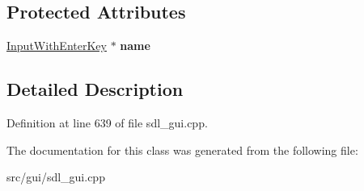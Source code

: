 \subsection*{Protected Attributes}
\begin{DoxyCompactItemize}
\item 
\hypertarget{classSetCycles_ad75bca3a041f5aa2d66ede78b1f563c9}{\hyperlink{classInputWithEnterKey}{Input\-With\-Enter\-Key} $\ast$ {\bfseries name}}\label{classSetCycles_ad75bca3a041f5aa2d66ede78b1f563c9}

\end{DoxyCompactItemize}


\subsection{Detailed Description}


Definition at line 639 of file sdl\-\_\-gui.\-cpp.



The documentation for this class was generated from the following file\-:\begin{DoxyCompactItemize}
\item 
src/gui/sdl\-\_\-gui.\-cpp\end{DoxyCompactItemize}
